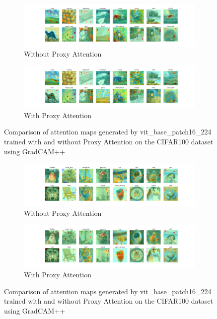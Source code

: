 \documentclass[a4paper,11pt,openright]{book}
\begin{document}
\begin{figure}[!htb]
    \centering
    \begin{subfigure}[b]{1\textwidth}
        \includegraphics[width=\textwidth]{images/cifar100_vit_base_patch16_224_noproxy_2.pdf}
        \caption{Without Proxy Attention}
    \end{subfigure}
    \hfill
    \begin{subfigure}[b]{1\textwidth}
        \includegraphics[width=\textwidth]{images/cifar100_vit_base_patch16_224_proxy_2.pdf}
        \caption{With Proxy Attention}
    \end{subfigure}
    \caption{Comparison of attention maps generated by vit\_base\_patch16\_224 trained with and without Proxy Attention on the CIFAR100 dataset using GradCAM++}
\end{figure}


\begin{figure}[!htb]
    \centering
    \begin{subfigure}[b]{1\textwidth}
        \includegraphics[width=\textwidth]{images/cifar100_vit_base_patch16_224_noproxy_3.pdf}
        \caption{Without Proxy Attention}
    \end{subfigure}
    \hfill
    \begin{subfigure}[b]{1\textwidth}
        \includegraphics[width=\textwidth]{images/cifar100_vit_base_patch16_224_proxy_3.pdf}
        \caption{With Proxy Attention}
    \end{subfigure}
    \caption{Comparison of attention maps generated by vit\_base\_patch16\_224 trained with and without Proxy Attention on the CIFAR100 dataset using GradCAM++}
\end{figure}
\end{document}
